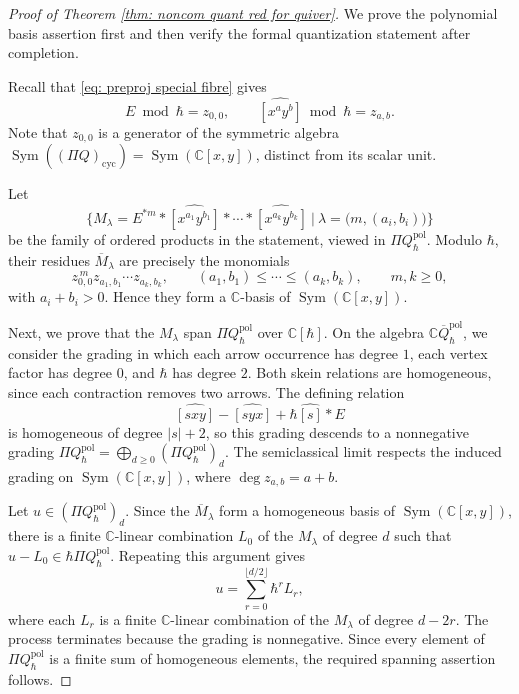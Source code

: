\documentclass[11pt,reqno]{amsart}
\theoremstyle{definition}
\newcommand{\bbC}{\mathbb{C}}
\newcommand{\qneck}{{\mathbb{C} \overline{Q}}_{\hbar}}
\newcommand{\Sym}{\operatorname{Sym}}
\newcommand{\pol}{\mathrm{pol}}
\begin{document}
\begin{proof}[Proof of Theorem \ref{thm: noncom quant red for quiver}]
We prove the polynomial basis assertion first and then verify the formal quantization statement after completion.

Recall that
\eqref{eq: preproj special fibre} gives
\[
E\bmod\hbar=z_{0,0},
\qquad
\widehat{[x^ay^b]}\bmod\hbar=z_{a,b}.
\]
Note that \(z_{0,0}\) is a generator of the symmetric
algebra \(\Sym ((\Pi Q)_{\mathrm{cyc}})
 =\Sym(\mathbb C[x,y])\),
distinct from its scalar unit.

Let
\[
\{M_\lambda = E^{*m}*\widehat{[x^{a_1}y^{b_1}]}*\cdots*\widehat{[x^{a_k}y^{b_k}]}\ \big\vert\ \lambda = \big( m , (a_i, b_i) \big) \}
\]
be the family of ordered products
in the statement, viewed in \(\Pi Q^\pol _\hbar \).
Modulo \(\hbar\),
their residues
\(\overline M_\lambda\) are precisely the monomials
\[
z_{0,0}^{\,m}z_{a_1,b_1}\cdots z_{a_k,b_k},
\qquad
(a_1,b_1)\leq\cdots\leq(a_k,b_k),\qquad m,k\geq0,
\]
with \(a_i+b_i>0\). Hence they form a \(\mathbb C\)-basis of \(\Sym(\mathbb C[x,y])\).

Next, we prove that the \(M_\lambda\) span \(\Pi Q^\pol _\hbar\)
over
\(\mathbb C[\hbar]\).
On the algebra \(\qneck^\pol\),
we consider the grading in which each arrow occurrence has degree
\(1\), each vertex factor has degree \(0\), and \(\hbar\) has
degree \(2\).
Both skein relations are homogeneous, since
each contraction removes two arrows.
The defining relation
\[
\widehat{[sxy]}-\widehat{[syx]}+\hbar \widehat{[s]}*E
\]
is homogeneous of degree \(|s|+2\),
so this grading descends
to a nonnegative grading \(\Pi Q^\pol _\hbar = \bigoplus_{d\geq0} (\Pi Q^\pol _\hbar)_d \).
The semiclassical limit respects the induced
grading on \(\Sym(\mathbb C[x,y])\), where \(\deg z_{a,b}=a+b\).

Let \(u \in (\Pi Q^\pol _\hbar)_d\).
Since the \(\overline M_\lambda\) form a
homogeneous basis of \(\Sym(\bbC[x,y])\),
there is a finite
\(\bbC\)-linear combination \(L_0\) of the \(M_\lambda\)
of degree \(d\) such that \(u-L_0\in\hbar \Pi Q_\hbar ^\pol\).
Repeating this argument gives
\[
u=\sum_{r=0}^{\lfloor d/2\rfloor}\hbar^rL_r,
\]
where each \(L_r\) is a finite \(\mathbb C\)-linear
combination of the \(M_\lambda\) of degree \(d-2r\).
The process terminates because the grading is nonnegative.
Since every element of \(\Pi Q_\hbar^\pol\) is a finite sum of homogeneous
elements, the required spanning assertion follows.






\end{proof}
\end{document}
